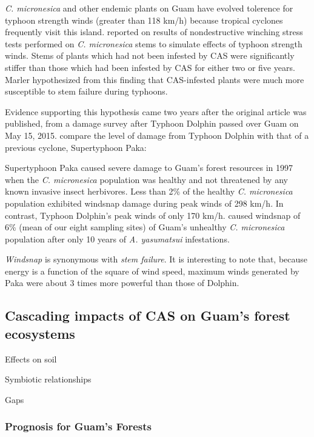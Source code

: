 \documentclass[12pt,letterpaper,english,bibliography=totocnumbered, abstract=on]{scrartcl}
\begin{document}
\textit{C. micronesica} and other endemic plants on Guam have evolved tolerence for typhoon strength winds (greater than 118 km/h) because tropical cyclones frequently visit this island.
\parencite{marlerIncreasedThreatIsland2013} reported on results of nondestructive winching stress tests performed on \textit{C. micronesica} stems to simulate effects of typhoon strength winds. Stems of plants which had not been infested by CAS were significantly stiffer than those which had been infested by CAS for either two or five years. Marler hypothesized from this finding that CAS-infested plants were much more susceptible to stem failure during typhoons.

Evidence supporting this hypothesis came two years after the original article was published, from a damage survey after Typhoon Dolphin passed over Guam on May 15, 2015.
\cite{marler2016topographic} compare the level of damage from Typhoon Dolphin with that of a previous cyclone, Supertyphoon Paka:
\begin{displayquote}
Supertyphoon Paka caused severe damage to
Guam’s forest resources in 1997 when the \textit{C. micronesica} population was
healthy and not threatened by any known invasive insect herbivores.
Less than 2\% of the healthy \textit{C. micronesica} population exhibited
windsnap damage during peak winds of 298 km/h. In contrast,
Typhoon Dolphin’s peak winds of only 170 km/h. caused windsnap
of 6\% (mean of our eight sampling sites) of Guam’s unhealthy \textit{C.
micronesica} population after only 10 years of \textit{A. yasumatsui} infestations.
\end{displayquote}
\textit{Windsnap} is synonymous with \textit{stem failure}. It is interesting to note that, because energy is a function of the square of wind speed, maximum winds generated by Paka were about 3 times more powerful than those of Dolphin.

\subsection{Cascading impacts of CAS on Guam's forest ecosystems}

Effects on soil \cite{marlerTwoCycadSpecies2020}

Symbiotic relationships

Gaps

\subsubsection{Prognosis for Guam's Forests} 
\end{document}
